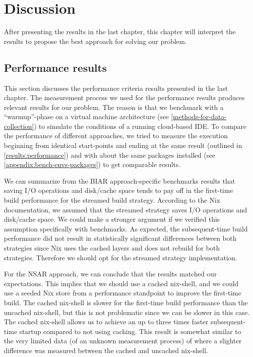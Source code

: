 
\chapter{Discussion}\label{discussion}
After presenting the results in the last chapter, this chapter will interpret the results to propose the best approach for solving our problem. 

\section{Performance results}\label{discussion:performance}
This section discusses the performance criteria results presented in the last chapter. The measurement process we used for the performance results produces relevant results for our problem. The reason is that we benchmark with a ``warmup''-phase on a virtual machine architecture (see \ref{methods-for-data-collection}) to simulate the conditions of a running cloud-based IDE. To compare the performance of different approaches, we tried to measure the execution beginning from identical start-points and ending at the same result (outlined in \ref{results:performance}) and with about the same packages installed (see \ref{appendix:bench-envs-packages}) to get comparable results. 

We can summarize from the BIAR approach-specific benchmarks results that saving I/O operations and disk/cache space tends to pay off in the first-time build performance for the streamed build strategy. According to the Nix documentation, we assumed that the streamed strategy saves I/O operations and disk/cache space. We could make a stronger argument if we verified this assumption specifically with benchmarks. As expected, the subsequent-time build performance did not result in statistically significant differences between both strategies since Nix uses the cached layers and does not rebuild for both strategies. Therefore we should opt for the streamed strategy implementation.

For the NSAR approach, we can conclude that the results matched our expectations. This implies that we should use a cached nix-shell, and we could use a seeded Nix store from a performance standpoint to improve the first-time build. The cached nix-shell is slower for the first-time build performance than the uncached nix-shell, but this is not problematic since we can be slower in this case. The cached nix-shell allows us to achieve an up to three times faster subsequent-time startup compared to not using caching. This result is somewhat similar to the very limited data (of an unknown measurement process) of \cite{CachedNixShell} where a slighter difference was measured between the cached and uncached nix-shell. 

